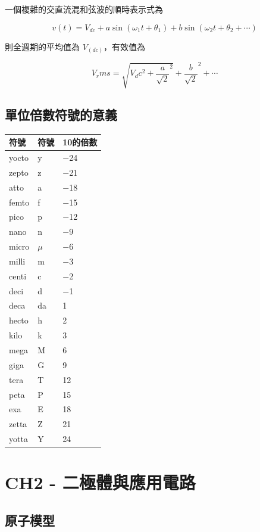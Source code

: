 \documentclass[
]{report}
\begin{document}
一個複雜的交直流混和弦波的順時表示式為

\[
v(t) = V_{dc} + a\sin({\omega}_1 t + {\theta}_1) + b\sin({\omega}_2 t + {\theta}_2 + \cdots)
\]

則全週期的平均值為 \(V_(dc)\)，有效值為

\[
V_rms = \sqrt{V_dc ^ 2 + {\frac{a}{\sqrt{2}}}^2} + {\frac{b}{\sqrt{2}}}^2 + \cdots
\]

\hypertarget{ux55aeux4f4dux500dux6578ux7b26ux865fux7684ux610fux7fa9}{%
\section{單位倍數符號的意義}\label{ux55aeux4f4dux500dux6578ux7b26ux865fux7684ux610fux7fa9}}

\begin{longtable}[]{@{}lll@{}}
\toprule()
符號 & 符號 & 10的倍數 \\
\midrule()
\endhead
yocto & y & −24 \\
zepto & z & −21 \\
atto & a & −18 \\
femto & f & −15 \\
pico & p & −12 \\
nano & n & −9 \\
micro & \(μ\) & −6 \\
milli & m & −3 \\
centi & c & −2 \\
deci & d & −1 \\
deca & da & 1 \\
hecto & h & 2 \\
kilo & k & 3 \\
mega & M & 6 \\
giga & G & 9 \\
tera & T & 12 \\
peta & P & 15 \\
exa & E & 18 \\
zetta & Z & 21 \\
yotta & Y & 24 \\
\bottomrule()
\end{longtable}

\hypertarget{ch2---ux4e8cux6975ux9ad4ux8207ux61c9ux7528ux96fbux8def}{%
\chapter{CH2 -
二極體與應用電路}\label{ch2---ux4e8cux6975ux9ad4ux8207ux61c9ux7528ux96fbux8def}}

\hypertarget{ux539fux5b50ux6a21ux578b}{%
\section{原子模型}\label{ux539fux5b50ux6a21ux578b}}
\end{document}

